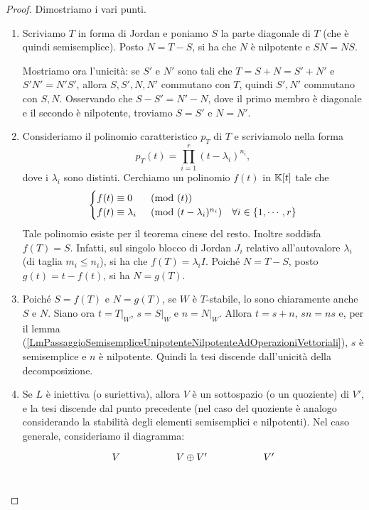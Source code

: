 \begin{proof}
Dimostriamo i vari punti. 
\setlength{\leftmargini}{0cm}
\begin{enumerate}
    \item Scriviamo $T$ in forma di Jordan e poniamo $S$ la parte diagonale di $T$ (che è quindi semisemplice). Posto $N=T-S$, si ha che $N$ è nilpotente e $SN=NS$.
    
    Mostriamo ora l'unicità: se $S'$ e $N'$ sono tali che $T=S+N=S'+N'$ e $S'N'=N'S'$, allora $S,S',N,N'$ commutano con $T$, quindi $S',N'$ commutano con $S,N$. Osservando che $S-S'=N'-N$, dove il primo membro è diagonale e il secondo è nilpotente, troviamo $S=S'$ e $N=N'$. 
    \item Consideriamo il polinomio caratteristico $p_T$ di $T$ e scriviamolo nella forma \[p_T(t)=\prod_{i=1}^r(t-\lambda_i)^{n_i},\] dove i $\lambda_i$ sono distinti. Cerchiamo un polinomio $f(t)$ in $\mathbb{K}[t]$ tale che 
    \[\begin{cases}
    f(t)\equiv 0 &\pmod{(t)}\\
    f(t)\equiv \lambda_i &\pmod{(t-\lambda_i)^{n_i}} \quad \forall i\in\left\{{1,\cdots, r}\right\}
    \end{cases}\]
    Tale polinomio esiste per il teorema cinese del resto. Inoltre soddisfa $f(T)=S$. Infatti, sul singolo blocco di Jordan $J_i$ relativo all'autovalore $\lambda_i$ (di taglia $m_i\le n_i$), si ha che $f(T)=\lambda_i I$. Poiché $N=T-S$, posto $g(t)=t-f(t)$, si ha $N=g(T)$. 
    \item Poiché $S=f(T)$ e $N=g(T)$, se $W$ è $T$-stabile, lo sono chiaramente anche $S$ e $N$. Siano ora $t=\left.T\right|_{W}$, $s=\left.S\right|_{W}$ e $n=\left.N\right|_{W}$. Allora $t=s+n$, $sn=ns$ e, per il lemma (\ref{LmPassaggioSemisempliceUnipotenteNilpotenteAdOperazioniVettoriali}), $s$ è semisemplice e $n$ è nilpotente. Quindi la tesi discende dall'unicità della decomposizione.
    \item Se $L$ è iniettiva (o suriettiva), allora $V$ è un sottospazio (o un quoziente) di $V'$, e la tesi discende dal punto precedente (nel caso del quoziente è analogo considerando la stabilità degli elementi semisemplici e nilpotenti). Nel caso generale, consideriamo il diagramma:
\[\begin{tikzcd}
	V && {V\oplus V'} && {V'} \\

\end{tikzcd}\]
\end{enumerate}
\end{proof}

